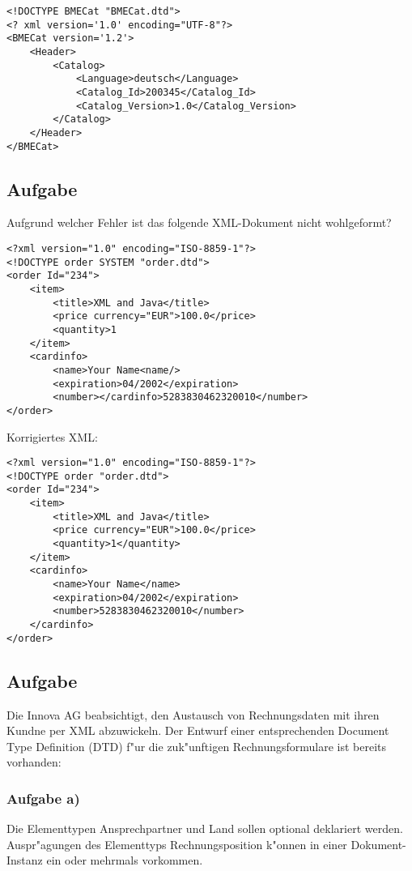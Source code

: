 \lstset{style=customXML}
\begin{lstlisting}
<!DOCTYPE BMECat "BMECat.dtd">
<? xml version='1.0' encoding="UTF-8"?>
<BMECat version='1.2'>
    <Header>
        <Catalog>
            <Language>deutsch</Language>
            <Catalog_Id>200345</Catalog_Id>
            <Catalog_Version>1.0</Catalog_Version>
        </Catalog>
    </Header>
</BMECat>
\end{lstlisting}




\subsection{Aufgabe}
Aufgrund welcher Fehler ist das folgende XML-Dokument nicht wohlgeformt?

\lstset{style=customXML}
\begin{lstlisting}
<?xml version="1.0" encoding="ISO-8859-1"?>
<!DOCTYPE order SYSTEM "order.dtd">
<order Id="234">
    <item>
        <title>XML and Java</title>
        <price currency="EUR">100.0</price>
        <quantity>1
    </item>
    <cardinfo>
        <name>Your Name<name/>
        <expiration>04/2002</expiration>
        <number></cardinfo>5283830462320010</number>
</order>
\end{lstlisting}

Korrigiertes XML:
\lstset{style=customXML}
\begin{lstlisting}
<?xml version="1.0" encoding="ISO-8859-1"?>
<!DOCTYPE order "order.dtd">
<order Id="234">
    <item>
        <title>XML and Java</title>
        <price currency="EUR">100.0</price>
        <quantity>1</quantity>
    </item>
    <cardinfo>
        <name>Your Name</name>
        <expiration>04/2002</expiration>
        <number>5283830462320010</number>
    </cardinfo>
</order>
\end{lstlisting}


\subsection{Aufgabe}

Die Innova AG beabsichtigt, den Austausch von Rechnungsdaten mit ihren Kundne per XML abzuwickeln.
Der Entwurf einer entsprechenden Document Type Definition (DTD) f"ur die zuk"unftigen Rechnungsformulare ist bereits vorhanden:

\subsubsection{Aufgabe a)}
Die Elementtypen Ansprechpartner und Land sollen optional deklariert werden.
Auspr"agungen des Elementtyps Rechnungsposition k"onnen in einer Dokument-Instanz ein oder mehrmals vorkommen.\\

